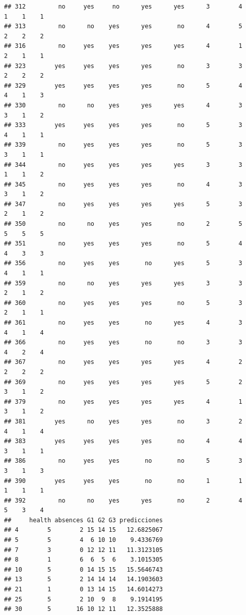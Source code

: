 \documentclass[
]{article}
\begin{document}
\begin{verbatim}
## 312         no     yes     no      yes      yes      3        4     1    1    1
## 313         no      no    yes      yes       no      4        5     2    2    2
## 316         no     yes    yes      yes      yes      4        1     2    1    1
## 323        yes     yes    yes      yes       no      3        3     2    2    2
## 329        yes     yes    yes      yes       no      5        4     4    1    3
## 330         no      no    yes      yes      yes      4        3     3    1    2
## 333        yes     yes    yes      yes       no      5        3     4    1    1
## 339         no     yes    yes      yes       no      5        3     3    1    1
## 344         no     yes    yes      yes      yes      3        3     1    1    2
## 345         no     yes    yes      yes       no      4        3     3    1    2
## 347         no     yes    yes      yes      yes      5        3     2    1    2
## 350         no      no    yes      yes       no      2        5     5    5    5
## 351         no     yes    yes      yes       no      5        4     4    3    3
## 356         no     yes    yes       no      yes      5        3     4    1    1
## 359         no      no    yes      yes      yes      3        3     2    1    2
## 360         no     yes    yes      yes       no      5        3     2    1    1
## 361         no     yes    yes       no      yes      4        3     4    1    4
## 366         no     yes    yes       no       no      3        3     4    2    4
## 367         no     yes    yes      yes      yes      4        2     2    2    2
## 369         no     yes    yes      yes      yes      5        2     3    1    2
## 379         no     yes    yes      yes      yes      4        1     3    1    2
## 381        yes      no    yes      yes       no      3        2     4    1    4
## 383        yes     yes    yes      yes       no      4        4     3    1    1
## 386         no     yes    yes       no       no      5        3     3    1    3
## 390        yes     yes    yes       no       no      1        1     1    1    1
## 392         no      no    yes      yes       no      2        4     5    3    4
##     health absences G1 G2 G3 predicciones
## 4        5        2 15 14 15   12.6825067
## 5        5        4  6 10 10    9.4336769
## 7        3        0 12 12 11   11.3123105
## 8        1        6  6  5  6    3.1015305
## 10       5        0 14 15 15   15.5646743
## 13       5        2 14 14 14   14.1903603
## 21       1        0 13 14 15   14.6014273
## 25       5        2 10  9  8    9.1914195
## 30       5       16 10 12 11   12.3525888

\end{verbatim}
\end{document}
